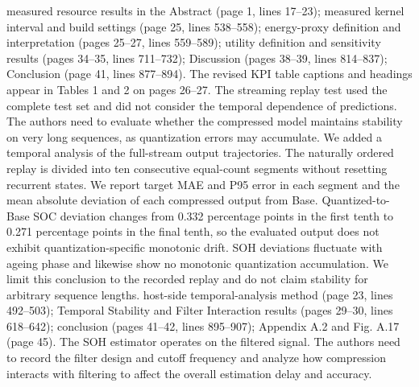 {} measured resource results in the Abstract (page 1, lines 17--23); measured kernel interval and build settings (page 25, lines 538--558); energy-proxy definition and interpretation (pages 25--27, lines 559--589); utility definition and sensitivity results (pages 34--35, lines 711--732); Discussion (pages 38--39, lines 814--837); Conclusion (page 41, lines 877--894). The revised KPI table captions and headings appear in Tables 1 and 2 on pages 26--27.\markdownRendererInterblockSeparator
{}
\markdownRendererSectionEnd \markdownRendererSectionBegin
{}\markdownRendererInterblockSeparator
{}\markdownRendererBlockQuoteBegin
The streaming replay test used the complete test set and did not consider the temporal dependence of predictions. The authors need to evaluate whether the compressed model maintains stability on very long sequences, as quantization errors may accumulate.\markdownRendererBlockQuoteEnd \markdownRendererInterblockSeparator
{} We added a temporal analysis of the full-stream output trajectories. The naturally ordered replay is divided into ten consecutive equal-count segments without resetting recurrent states. We report target MAE and P95 error in each segment and the mean absolute deviation of each compressed output from Base. Quantized-to-Base SOC deviation changes from 0.332 percentage points in the first tenth to 0.271 percentage points in the final tenth, so the evaluated output does not exhibit quantization-specific monotonic drift. SOH deviations fluctuate with ageing phase and likewise show no monotonic quantization accumulation. We limit this conclusion to the recorded replay and do not claim stability for arbitrary sequence lengths.\markdownRendererParagraphSeparator
{} host-side temporal-analysis method (page 23, lines 492--503); Temporal Stability and Filter Interaction results (pages 29--30, lines 618--642); conclusion (pages 41--42, lines 895--907); Appendix A.2 and Fig. A.17 (page 45).\markdownRendererInterblockSeparator
{}
\markdownRendererSectionEnd \markdownRendererSectionBegin
{}\markdownRendererInterblockSeparator
{}\markdownRendererBlockQuoteBegin
The SOH estimator operates on the filtered signal. The authors need to record the filter design and cutoff frequency and analyze how compression interacts with filtering to affect the overall estimation delay and accuracy.\markdownRendererBlockQuoteEnd \markdownRendererInterblockSeparator
